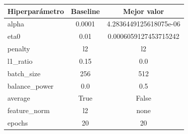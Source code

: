 \begin{tabular}{lcc}
\toprule
\textbf{Hiperparámetro} & \textbf{Baseline} & \textbf{Mejor valor} \\
\midrule
alpha & 0.0001 & 4.2836449125618075e-06 \\
eta0 & 0.01 & 0.0006059127453715242 \\
penalty & l2 & l2 \\
l1\_ratio & 0.15 & 0.0 \\
batch\_size & 256 & 512 \\
balance\_power & 0.0 & 0.5 \\
average & True & False \\
feature\_norm & l2 & none \\
epochs & 20 & 20 \\
\bottomrule
\end{tabular}
